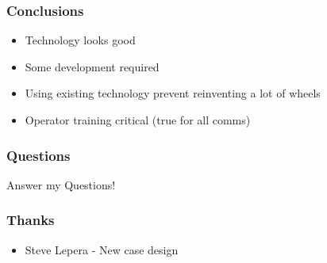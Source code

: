 \documentclass{beamer}
\begin{document}
\begin{frame}
\frametitle{Conclusions}

\begin{itemize}
\item Technology looks good
\item Some development required
\item Using existing technology prevent reinventing a lot of wheels
\item Operator training critical (true for all comms)
\end{itemize}
\end{frame}

\begin{frame}
\frametitle{Questions}

Answer my Questions!

\end{frame}

\begin{frame}
\frametitle{Thanks}

\begin{itemize}
\item Steve Lepera - New case design
\end{itemize}

\end{frame}
\end{document}
